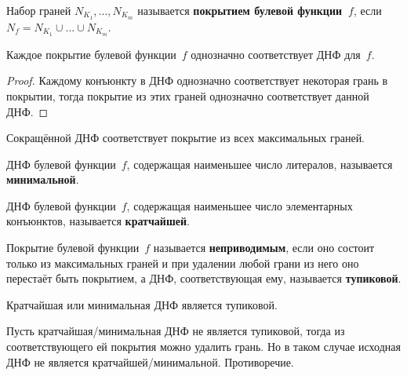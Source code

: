  Набор граней $N_{K_1}, \ldots, N_{K_m}$ называется \textbf{покрытием булевой функции~$f$}, если $N_f = N_{K_1} \cup \ldots \cup N_{K_m}$.

\begin{statement}
Каждое покрытие булевой функции~$f$ однозначно соответствует ДНФ для~$f$.
\end{statement}
\begin{proof}
Каждому конъюнкту в ДНФ однозначно соответствует некоторая грань в покрытии, тогда покрытие из этих граней однозначно соответствует данной ДНФ.
\end{proof}

\begin{consequent}
Сокращённой ДНФ соответствует покрытие из всех максимальных граней.
\end{consequent}

ДНФ булевой функции~$f$, содержащая наименьшее число литералов, называется \textbf{минимальной}.

ДНФ булевой функции~$f$, содержащая наименьшее число элементарных конъюнктов, называется \textbf{кратчайшей}.

Покрытие булевой функции~$f$ называется \textbf{неприводимым}, если оно состоит только из максимальных граней и при удалении любой грани из него оно перестаёт быть покрытием, а ДНФ, соответствующая ему, называется \textbf{тупиковой}.

\begin{statement}
Кратчайшая или минимальная ДНФ является тупиковой.
\end{statement}
\begin{proofcontra}
Пусть кратчайшая/минимальная ДНФ не является тупиковой, тогда из соответствующего ей покрытия можно удалить грань.
Но в таком случае исходная ДНФ не является кратчайшей/минимальной.
Противоречие.
\end{proofcontra}
